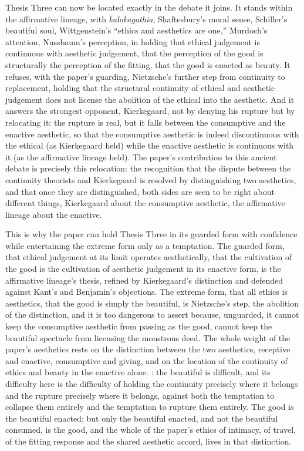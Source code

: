 Thesis Three can now be located exactly in the debate it joins. It stands within the affirmative lineage, with \emph{kalokagathia}, Shaftesbury's moral sense, Schiller's beautiful soul, Wittgenstein's ``ethics and aesthetics are one,'' Murdoch's attention, Nussbaum's perception, in holding that ethical judgement is continuous with aesthetic judgement, that the perception of the good is structurally the perception of the fitting, that the good is enacted as beauty. It refuses, with the paper's guarding, Nietzsche's further step from continuity to replacement, holding that the structural continuity of ethical and aesthetic judgement does not license the abolition of the ethical into the aesthetic. And it answers the strongest opponent, Kierkegaard, not by denying his rupture but by relocating it: the rupture is real, but it falls between the consumptive and the enactive aesthetic, so that the consumptive aesthetic is indeed discontinuous with the ethical (as Kierkegaard held) while the enactive aesthetic is continuous with it (as the affirmative lineage held). The paper's contribution to this ancient debate is precisely this relocation: the recognition that the dispute between the continuity theorists and Kierkegaard is resolved by distinguishing two aesthetics, and that once they are distinguished, both sides are seen to be right about different things, Kierkegaard about the consumptive aesthetic, the affirmative lineage about the enactive.

This is why the paper can hold Thesis Three in its guarded form with confidence while entertaining the extreme form only as a temptation. The guarded form, that ethical judgement at its limit operates aesthetically, that the cultivation of the good is the cultivation of aesthetic judgement in its enactive form, is the affirmative lineage's thesis, refined by Kierkegaard's distinction and defended against Kant's and Benjamin's objections. The extreme form, that all ethics is aesthetics, that the good is simply the beautiful, is Nietzsche's step, the abolition of the distinction, and it is too dangerous to assert because, unguarded, it cannot keep the consumptive aesthetic from passing as the good, cannot keep the beautiful spectacle from licensing the monstrous deed. The whole weight of the paper's aesthetics rests on the distinction between the two aesthetics, receptive and enactive, consumptive and giving, and on the location of the continuity of ethics and beauty in the enactive alone. : the beautiful is difficult, and its difficulty here is the difficulty of holding the continuity precisely where it belongs and the rupture precisely where it belongs, against both the temptation to collapse them entirely and the temptation to rupture them entirely. The good is the beautiful enacted; but only the beautiful enacted, and not the beautiful consumed, is the good, and the whole of the paper's ethics of intimacy, of travel, of the fitting response and the shared aesthetic accord, lives in that distinction.
